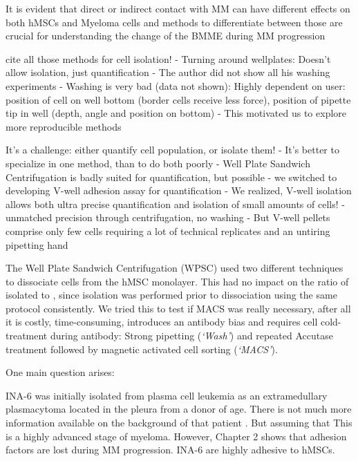 It is evident that direct or indirect contact with MM can have different effects
on both hMSCs and Myeloma cells and methods to differentiate between those are
crucial for understanding the change of the \ac{BMME} during \ac{MM} progression
\cite{fairfieldMultipleMyelomaCells2020, dziadowiczBoneMarrowStromaInduced2022}

cite all those methods for cell isolation!
- Turning around wellplates: Doesn't allow isolation, just quantification
- The author did not show all his washing experiments
- Washing is very bad (data not shown): Highly dependent on user:
position of cell on well bottom (border cells receive less force), position of
pipette tip in well (depth, angle and position on bottom)
- This motivated us to explore more reproducible methods

It's a challenge: either quantify cell population, or isolate them!
- It's better to specialize in one method, than to do both poorly
- Well Plate Sandwich Centrifugation is badly suited for quantification, but possible
- we switched to developing V-well adhesion assay for quantification
- We realized, V-well isolation allows both ultra precise quantification and
isolation of small amounts of cells!
- unmatched precision through centrifugation, no washing
- But V-well pellets comprise only few cells requiring a lot of technical
replicates and an untiring pipetting hand %


The Well Plate
Sandwich Centrifugation (WPSC) used two different techniques to dissociate
\MAina cells from the hMSC monolayer. This had no impact on the ratio of
isolated \MAina to \nMAina, since \nMAina isolation was performed prior to
dissociation using the same protocol consistently. We tried this to test if MACS
was really necessary, after all it is costly, time-consuming, introduces an antibody bias
and requires cell cold-treatment during antibody: Strong pipetting
(\emph{`Wash'}) and repeated Accutase treatment followed by magnetic activated
cell sorting (\emph{`MACS'}).

%
\label{sec:discussion_dynamic_regulation}%

One main question arises:

INA-6 was initially isolated from plasma cell leukemia as an extramedullary
plasmacytoma located in the pleura from a donor of age.
There is not much more information available on the background of that patient \cite{TwoNewInterleukin6,burgerGp130RasMediated2001}.
But assuming that
This is a highly advanced
stage of myeloma. However,  Chapter 2 shows that adhesion factors are
lost during MM progression. INA-6 are highly adhesive to hMSCs.



